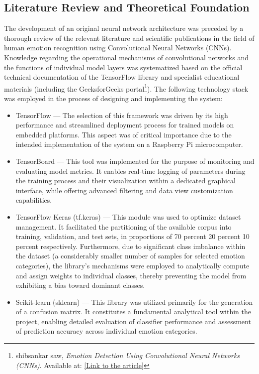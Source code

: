 \documentclass{article}
\begin{document}
\subsection{Literature Review and Theoretical Foundation}
The development of an original neural network architecture was preceded by a thorough review of the relevant literature and scientific publications in the field of human emotion recognition using Convolutional Neural Networks (CNNs). Knowledge regarding the operational mechanisms of convolutional networks and the functions of individual model layers was systematized based on the official technical documentation of the TensorFlow \cite{tensorflow} library and specialist educational materials (including the GeeksforGeeks portal\footnote{shibsankar saw, \textit{Emotion Detection Using Convolutional Neural Networks (CNNs)}. Available at: \href{https://www.geeksforgeeks.org/deep-learning/emotion-detection-using-convolutional-neural-networks-cnns/}{[Link to the article]}}).
The following technology stack was employed in the process of designing and implementing the system:
\begin{itemize}
\item TensorFlow — The selection of this framework was driven by its high performance and streamlined deployment process for trained models on embedded platforms. This aspect was of critical importance due to the intended implementation of the system on a Raspberry Pi microcomputer.
\item TensorBoard — This tool was implemented for the purpose of monitoring and evaluating model metrics. It enables real-time logging of parameters during the training process and their visualization within a dedicated graphical interface, while offering advanced filtering and data view customization capabilities.
\item TensorFlow Keras (tf.keras) — This module was used to optimize dataset management. It facilitated the partitioning of the available corpus into training, validation, and test sets, in proportions of 70 percent 20 percent  10 percent respectively. Furthermore, due to significant class imbalance within the dataset (a considerably smaller number of samples for selected emotion categories), the library's mechanisms were employed to analytically compute and assign weights to individual classes, thereby preventing the model from exhibiting a bias toward dominant classes.
\item Scikit-learn (sklearn) — This library was utilized primarily for the generation of a confusion matrix. It constitutes a fundamental analytical tool within the project, enabling detailed evaluation of classifier performance and assessment of prediction accuracy across individual emotion categories.
\end{itemize}
\end{document}
